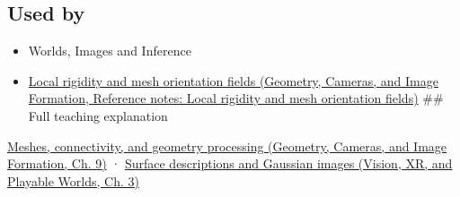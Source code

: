 \subsection{Used by}\label{appendix-0234ab7f86b1-used-by}

\hypertarget{appendix-0234ab7f86b1-used-by}{}

\begin{itemize}
\item
  {Worlds, Images and Inference}
\item
  \href{../03-Geometry-Cameras-and-Image-Formation/main.pdf\#nameddest=appendix-7107009c505b}{Local rigidity and mesh orientation fields (Geometry, Cameras, and Image Formation, Reference notes: Local rigidity and mesh orientation fields)} \#\# Full teaching explanation
\end{itemize}

\href{../03-Geometry-Cameras-and-Image-Formation/main.pdf\#nameddest=03-visual-computing-i-ch002-meshes-connectivity-and-geometry-processing}{Meshes, connectivity, and geometry processing (Geometry, Cameras, and Image Formation, Ch. 9)} · \href{../07-Vision-XR-and-Playable-Worlds/main.pdf\#nameddest=04-visual-computing-ii-ch032-surface-descriptions-and-gaussian-images}{Surface descriptions and Gaussian images (Vision, XR, and Playable Worlds, Ch. 3)}
